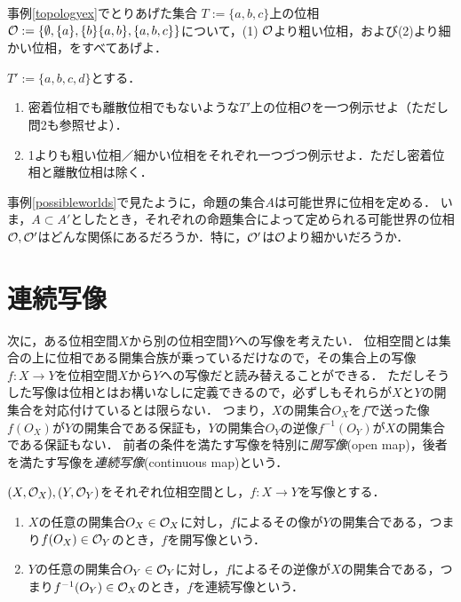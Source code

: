\documentclass[11pt,a4paper]{jsarticle}
\begin{document}
\begin{exercise}
事例\ref{topologyex}でとりあげた集合 $T:=\{a, b, c\}$上の位相$\mathcal{O} := \{ \emptyset, \{a \}, \{b\} \{a,b\}, \{a,b,c\} \}$について，(1) $\mathcal{O}$より粗い位相，および(2)より細かい位相，をすべてあげよ．
\end{exercise}


\begin{exercise}
$T':=\{a, b, c, d\}$とする．
\begin{enumerate}
 \item 密着位相でも離散位相でもないような$T'$上の位相$\mathcal{O}$を一つ例示せよ（ただし問2も参照せよ）．
 \item 1よりも粗い位相／細かい位相をそれぞれ一つづつ例示せよ．ただし密着位相と離散位相は除く．
\end{enumerate}
\end{exercise}


\begin{develop}
事例\ref{possibleworlds}で見たように，命題の集合$A$は可能世界に位相を定める．
いま，$A \subset A'$としたとき，それぞれの命題集合によって定められる可能世界の位相$\mathcal{O}, \mathcal{O}'$はどんな関係にあるだろうか．特に，$\mathcal{O}'$は$\mathcal{O}$より細かいだろうか．
\end{develop}






\section{連続写像}
次に，ある位相空間$X$から別の位相空間$Y$への写像を考えたい．
位相空間とは集合の上に位相である開集合族が乗っているだけなので，その集合上の写像$f:X \to Y$を位相空間$X$から$Y$への写像だと読み替えることができる．
ただしそうした写像は位相とはお構いなしに定義できるので，必ずしもそれらが$X$と$Y$の開集合を対応付けているとは限らない．
つまり，$X$の開集合$O_X$を$f$で送った像$f(O_X)$が$Y$の開集合である保証も，$Y$の開集合$O_Y$の逆像$f^{-1}(O_Y)$が$X$の開集合である保証もない．
前者の条件を満たす写像を特別に\emph{開写像}(open map)，後者を満たす写像を\emph{連続写像}(continuous map)という．

\begin{dfn}[開写像と連続写像]
  $(X, \mathcal{O}_X), (Y, \mathcal{O}_Y)$をそれぞれ位相空間とし，$f:X \to Y$を写像とする．
  \begin{enumerate}
    \item $X$の任意の開集合$O_X \in \mathcal{O}_X$に対し，$f$によるその像が$Y$の開集合である，つまり$f(O_X) \in \mathcal{O}_Y$のとき，$f$を開写像という．
    \item $Y$の任意の開集合$O_Y \in \mathcal{O}_Y$に対し，$f$によるその逆像が$X$の開集合である，つまり$f^{-1}(O_Y) \in \mathcal{O}_X$のとき，$f$を連続写像という．
  \end{enumerate}  
\end{dfn}
  
\end{document}
